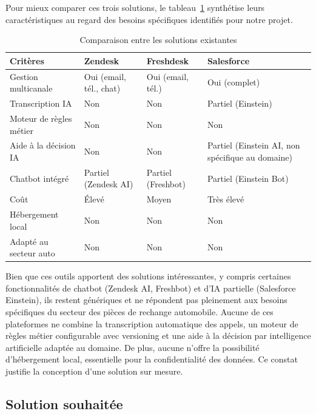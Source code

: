 \indent Pour mieux comparer ces trois solutions, le tableau~\ref{tab:comparaison} synth\'{e}tise leurs caract\'{e}ristiques au regard des besoins sp\'{e}cifiques identifi\'{e}s pour notre projet.

\begin{table}[H]
\centering
\caption{Comparaison entre les solutions existantes}
\label{tab:comparaison}
\begin{tabular}{|p{3.5cm}|p{3cm}|p{3cm}|p{3.5cm}|}
\hline
\textbf{Crit\`{e}res} & \textbf{Zendesk} & \textbf{Freshdesk} & \textbf{Salesforce} \\
\hline
Gestion multicanale & Oui (email, t\'{e}l., chat) & Oui (email, t\'{e}l.) & Oui (complet) \\
\hline
Transcription IA & Non & Non & Partiel (Einstein) \\
\hline
Moteur de r\`{e}gles m\'{e}tier & Non & Non & Non \\
\hline
Aide \`{a} la d\'{e}cision IA & Non & Non & Partiel (Einstein AI, non sp\'{e}cifique au domaine) \\
\hline
Chatbot int\'{e}gr\'{e} & Partiel (Zendesk AI) & Partiel (Freshbot) & Partiel (Einstein Bot) \\
\hline
Co\^{u}t & \'{E}lev\'{e} & Moyen & Tr\`{e}s \'{e}lev\'{e} \\
\hline
H\'{e}bergement local & Non & Non & Non \\
\hline
Adapt\'{e} au secteur auto & Non & Non & Non \\
\hline
\end{tabular}
\end{table}

\indent Bien que ces outils apportent des solutions int\'{e}ressantes, y compris certaines fonctionnalit\'{e}s de chatbot (Zendesk AI, Freshbot) et d'IA partielle (Salesforce Einstein), ils restent g\'{e}n\'{e}riques et ne r\'{e}pondent pas pleinement aux besoins sp\'{e}cifiques du secteur des pi\`{e}ces de rechange automobile. Aucune de ces plateformes ne combine la transcription automatique des appels, un moteur de r\`{e}gles m\'{e}tier configurable avec versioning et une aide \`{a} la d\'{e}cision par intelligence artificielle adapt\'{e}e au domaine. De plus, aucune n'offre la possibilit\'{e} d'h\'{e}bergement local, essentielle pour la confidentialit\'{e} des donn\'{e}es. Ce constat justifie la conception d'une solution sur mesure.

\subsection{Solution souhait\'{e}e}

